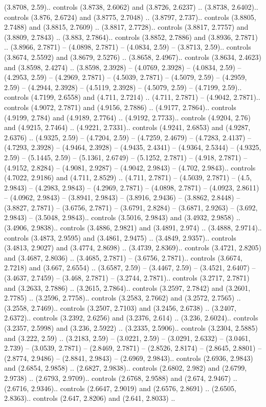 (3.8708, 2.59).. controls (3.8738, 2.6062) and (3.8726, 2.6237) .. (3.8738, 2.6402).. controls (3.876, 2.6724) and (3.8775, 2.7048) .. (3.8797, 2.737).. controls (3.8805, 2.7488) and (3.8815, 2.7609) .. (3.8817, 2.7728).. controls (3.8817, 2.7757) and (3.8809, 2.7843) .. (3.883, 2.7864).. controls (3.8852, 2.7886) and (3.8936, 2.7871) .. (3.8966, 2.7871) -- (4.0898, 2.7871) -- (4.0834, 2.59) -- (3.8713, 2.59).. controls (3.8674, 2.5592) and (3.8679, 2.5276) .. (3.8658, 2.4967).. controls (3.8634, 2.4623) and (3.8598, 2.4274) .. (3.8598, 2.3928) -- (4.0769, 2.3928) -- (4.0834, 2.59) -- (4.2953, 2.59) -- (4.2969, 2.7871) -- (4.5039, 2.7871) -- (4.5079, 2.59) -- (4.2959, 2.59) -- (4.2944, 2.3928) -- (4.5119, 2.3928) -- (4.5079, 2.59) -- (4.7199, 2.59).. controls (4.7199, 2.6558) and (4.711, 2.7214) .. (4.711, 2.7871) -- (4.9042, 2.7871).. controls (4.9072, 2.7871) and (4.9156, 2.7886) .. (4.9177, 2.7864).. controls (4.9199, 2.784) and (4.9189, 2.7764) .. (4.9192, 2.7733).. controls (4.9204, 2.76) and (4.9215, 2.7464) .. (4.9221, 2.7331).. controls (4.9241, 2.6853) and (4.9287, 2.6376) .. (4.9325, 2.59) -- (4.7204, 2.59) -- (4.7259, 2.4679) -- (4.7283, 2.4137) -- (4.7293, 2.3928) -- (4.9464, 2.3928) -- (4.9435, 2.4341) -- (4.9364, 2.5344) -- (4.9325, 2.59) -- (5.1445, 2.59) -- (5.1361, 2.6749) -- (5.1252, 2.7871) -- (4.918, 2.7871) -- (4.9152, 2.8284) -- (4.9081, 2.9287) -- (4.9042, 2.9843) -- (4.702, 2.9843).. controls (4.7022, 2.9186) and (4.711, 2.8529) .. (4.711, 2.7871) -- (4.5039, 2.7871) -- (4.5, 2.9843) -- (4.2983, 2.9843) -- (4.2969, 2.7871) -- (4.0898, 2.7871) -- (4.0923, 2.8611) -- (4.0962, 2.9843) -- (3.8941, 2.9843) -- (3.8916, 2.9436) -- (3.8862, 2.8448) -- (3.8827, 2.7871) -- (3.6756, 2.7871) -- (3.6791, 2.8284) -- (3.6871, 2.9263) -- (3.692, 2.9843) -- (3.5048, 2.9843).. controls (3.5016, 2.9843) and (3.4932, 2.9858) .. (3.4906, 2.9838).. controls (3.4886, 2.9821) and (3.4891, 2.974) .. (3.4888, 2.9714).. controls (3.4873, 2.9595) and (3.4861, 2.9475) .. (3.4849, 2.9357).. controls (3.4813, 2.9027) and (3.4774, 2.8698) .. (3.4739, 2.8369).. controls (3.4721, 2.8205) and (3.4687, 2.8036) .. (3.4685, 2.7871) -- (3.6756, 2.7871).. controls (3.6674, 2.7218) and (3.667, 2.6554) .. (3.6587, 2.59) -- (3.4467, 2.59) -- (3.4521, 2.6407) -- (3.4637, 2.7459) -- (3.468, 2.7871) -- (3.2744, 2.7871).. controls (3.2717, 2.7871) and (3.2633, 2.7886) .. (3.2615, 2.7864).. controls (3.2597, 2.7842) and (3.2601, 2.7785) .. (3.2596, 2.7758).. controls (3.2583, 2.7662) and (3.2572, 2.7565) .. (3.2558, 2.7469).. controls (3.2507, 2.7103) and (3.2456, 2.6738) .. (3.2407, 2.6372).. controls (3.2392, 2.6256) and (3.2376, 2.614) .. (3.236, 2.6024).. controls (3.2357, 2.5998) and (3.236, 2.5922) .. (3.2335, 2.5906).. controls (3.2304, 2.5885) and (3.222, 2.59) .. (3.2183, 2.59) -- (3.0221, 2.59) -- (3.0291, 2.6332) -- (3.0461, 2.739) -- (3.0539, 2.7871) -- (2.8469, 2.7871) -- (2.8526, 2.8174) -- (2.8645, 2.8801) -- (2.8774, 2.9486) -- (2.8841, 2.9843) -- (2.6969, 2.9843).. controls (2.6936, 2.9843) and (2.6854, 2.9858) .. (2.6827, 2.9838).. controls (2.6802, 2.982) and (2.6799, 2.9738) .. (2.6793, 2.9709).. controls (2.6768, 2.9588) and (2.674, 2.9467) .. (2.6716, 2.9346).. controls (2.6647, 2.9019) and (2.6576, 2.8691) .. (2.6505, 2.8363).. controls (2.647, 2.8206) and (2.641, 2.8033) .. 